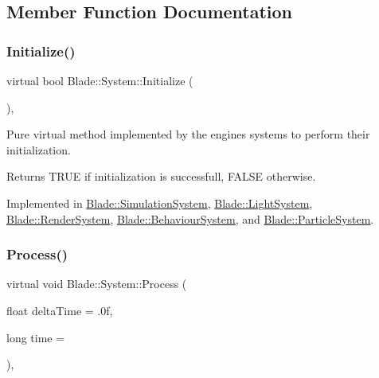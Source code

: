 \subsection{Member Function Documentation}
\mbox{\label{class_blade_1_1_system_a63fa00af40dc54d093300eff4785f26f}} 
\subsubsection{\texorpdfstring{Initialize()}{Initialize()}}
{\footnotesize\ttfamily virtual bool Blade\+::\+System\+::\+Initialize (\begin{DoxyParamCaption}{ }\end{DoxyParamCaption})\hspace{0.3cm}{\ttfamily [pure virtual]}, {\ttfamily [noexcept]}}



Pure virtual method implemented by the engine\textquotesingle{}s systems to perform their initialization. 

\begin{DoxyReturn}{Returns}
T\+R\+UE if initialization is successfull, F\+A\+L\+SE otherwise. 
\end{DoxyReturn}


Implemented in \hyperlink{class_blade_1_1_simulation_system_a44ca3c7941497162d70f1e9e53b016f9}{Blade\+::\+Simulation\+System}, \hyperlink{class_blade_1_1_light_system_af87b68ecd946b49576a17e59bfc88934}{Blade\+::\+Light\+System}, \hyperlink{class_blade_1_1_render_system_a476d3d55dcc9f65e8a88096aace6dcfc}{Blade\+::\+Render\+System}, \hyperlink{class_blade_1_1_behaviour_system_ac4d601f2f88faf7deceb78e01ca8d6be}{Blade\+::\+Behaviour\+System}, and \hyperlink{class_blade_1_1_particle_system_ae409003e325c44d82a3dcd1794ffb77d}{Blade\+::\+Particle\+System}.

\mbox{\label{class_blade_1_1_system_a80c186f5f9f8fa4fd317b861853fe6a8}} 
\subsubsection{\texorpdfstring{Process()}{Process()}}
{\footnotesize\ttfamily virtual void Blade\+::\+System\+::\+Process (\begin{DoxyParamCaption}\item[{float}]{delta\+Time = {\ttfamily .0f},  }\item[{long}]{time = {} }\end{DoxyParamCaption})\hspace{0.3cm}{\ttfamily [pure virtual]}, {\ttfamily [noexcept]}}



